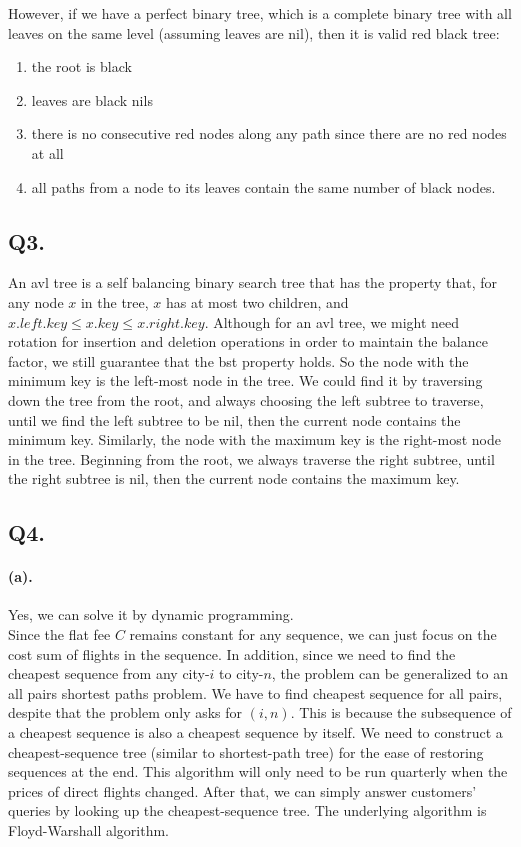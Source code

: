 \documentclass[12pt]{article}
\begin{document}
\noindent However, if we have a perfect binary tree, which is a complete binary tree with all leaves on the same level (assuming leaves are nil), then it is valid red black tree:
     \begin{enumerate}
          \setlength \itemsep{0em} 
          \item the root is black
          \item leaves are black nils
          \item there is no consecutive red nodes along any path since there are no red nodes at all
          \item all paths from a node to its leaves contain the same number of black nodes.
     \end{enumerate}

\subsection*{Q3.}
An avl tree is a self balancing binary search tree that has the property that, for any node \(x\) in the tree, \(x\) has at most two children, and \(x.left.key \leq x.key \leq x.right.key\). Although for an avl tree, we might need rotation for insertion and deletion operations in order to maintain the balance factor, we still guarantee that the bst property holds. So the node with the minimum key is the left-most node in the tree. We could find it by traversing down the tree from the root, and always choosing the left subtree to traverse, until we find the left subtree to be nil, then the current node contains the minimum key. Similarly, the node with the maximum key is the right-most node in the tree. Beginning from the root, we always traverse the right subtree, until the right subtree is nil, then the current node contains the maximum key. 

\subsection*{Q4.}
\paragraph{(a).} Yes, we can solve it by dynamic programming.\\ 
Since the flat fee \(C\) remains constant for any sequence, we can just focus on the cost sum of flights in the sequence. In addition, since we need to find the cheapest sequence from any city-\(i\) to city-\(n\), the problem can be generalized to an all pairs shortest paths problem. We have to find cheapest sequence for all pairs, despite that the problem only asks for \((i,n)\). This is because the subsequence of a cheapest sequence is also a cheapest sequence by itself. We need to construct a cheapest-sequence tree (similar to shortest-path tree) for the ease of restoring sequences at the end. This algorithm will only need to be run quarterly when the prices of direct flights changed. After that, we can simply answer customers' queries by looking up the cheapest-sequence tree. The underlying algorithm is Floyd-Warshall algorithm.
\end{document}
